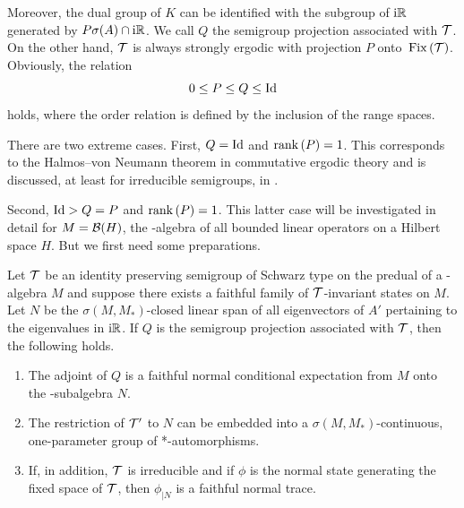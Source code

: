Moreover, the dual group of\/ $K$ can be identified with the subgroup of\/ $\mathrm{i}\mathbb{R}$ generated by 
$P\sigma(A) \cap \mathrm{i}  \mathbb{R} $.
We call $Q$ the semigroup projection associated with $\mathcal{T}$.
On the other hand, $\mathcal{T}$ is always strongly ergodic with projection $P$ onto $\mathop{}\mathrm{Fix}\left(\mathcal{T}\right)$.
Obviously, the relation
\[
    0 \leq P \leq Q \leq \Id 
\]
holds, where the order relation is defined by the inclusion of the range spaces.

There are two extreme cases.
First, $Q = \operatorname{Id}$ and $ \mathop{}\!\mathrm{rank}\, (P) = 1$.
This corresponds to the Halmos--von Neumann theorem in commutative ergodic theory and is discussed, at least for irreducible semigroups, in \textcite{olesen:1980}.

Second, $\operatorname{Id} > Q = P$ and $\mathop{}\!\mathrm{rank}\,(P) = 1$.
This latter case will be investigated in detail for $M = \mathcal{B}(H) $, the \WA-algebra of all bounded linear operators on a Hilbert space $H$.
But we first need some preparations.
\begin{theorem}\label{thm:d4-3.5}
Let $\mathcal{T}$ be an identity preserving semigroup of Schwarz type on the predual of a \WA-algebra $M$ and suppose there exists a faithful family of\/ $\mathcal{T}$-invariant states on $M$.
Let $N$ be the $\sigma(M,M_{*})$-closed linear span of all eigenvectors of\/ $A'$ pertaining to the eigenvalues in $\mathrm{i}\mathbb{R}$.
If\/ $Q$ is the semigroup projection associated with $\mathcal{T}$, then the following holds.
\begin{enumerate}[\upshape (i)]
\item 
The adjoint of\/ $Q$ is a faithful normal conditional expectation from $M$ onto the \WA-subalgebra $N$.

\item 
The restriction of\/ $\mathcal{T}'$ to $N$ can be embedded into a $\sigma(M,M_{*})$-continuous, one-parameter group of *-automorphisms.

\item 
If, in addition, $\mathcal{T}$ is irreducible and if\/ $\phi$ is the normal state generating the fixed space of\/ $\mathcal{T}$, then $\phi_{\vert N}$ is a faithful normal trace.

\end{enumerate}
\end{theorem}
